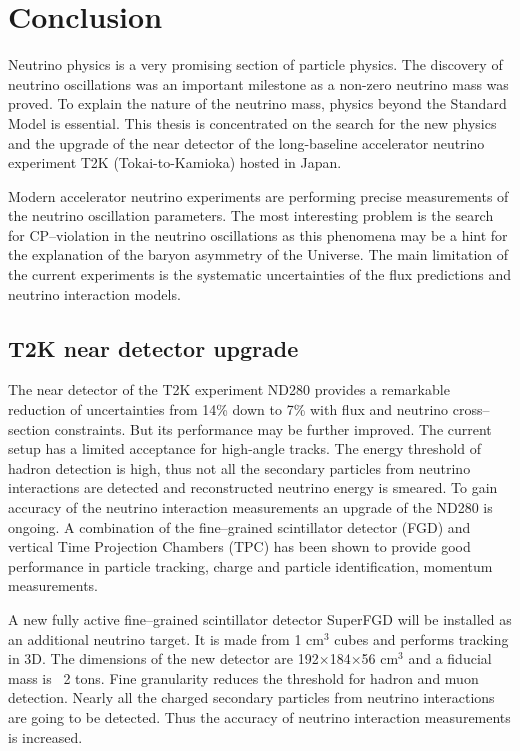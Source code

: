 \documentclass[./main.tex]{subfiles}
\begin{document}
\chapter*{Conclusion}

Neutrino physics is a very promising section of particle physics. The discovery of neutrino oscillations was an important milestone as a non-zero neutrino mass was proved. To explain the nature of the neutrino mass, physics beyond the Standard Model is essential. This thesis is concentrated on the search for the new physics and the upgrade of the near detector of the long-baseline accelerator neutrino experiment T2K (Tokai-to-Kamioka) hosted in Japan.

Modern accelerator neutrino experiments are performing precise measurements of the neutrino oscillation parameters. The most interesting problem is the search for CP--violation in the neutrino oscillations as this phenomena may be a hint for the explanation of the baryon asymmetry of the Universe. The main limitation of the current experiments is the systematic uncertainties of the flux predictions and neutrino interaction models.
\setcounter{section}{0}
\section{T2K near detector upgrade}
The near detector of the T2K experiment ND280 provides a remarkable reduction of uncertainties from 14\% down to 7\% with flux and neutrino cross--section constraints. But its performance may be further improved. The current setup has a limited acceptance for high-angle tracks. The energy threshold of hadron detection is high, thus not all the secondary particles from neutrino interactions are detected and reconstructed neutrino energy is smeared. To gain accuracy of the neutrino interaction measurements an upgrade of the ND280 is ongoing. A combination of the fine--grained scintillator detector (FGD) and vertical Time Projection Chambers (TPC) has been shown to provide good performance in particle tracking, charge and particle identification, momentum measurements.

A new fully active fine--grained scintillator detector SuperFGD will be installed as an additional neutrino target. It is made from 1 cm${}^3$ cubes and performs tracking in 3D. The dimensions of the new detector are 192$\times$184$\times$56 cm${}^3$ and a fiducial mass is ~2 tons. Fine granularity reduces the threshold for hadron and muon detection. Nearly all the charged secondary particles from neutrino interactions are going to be detected. Thus the accuracy of neutrino interaction measurements is increased.
\end{document}
